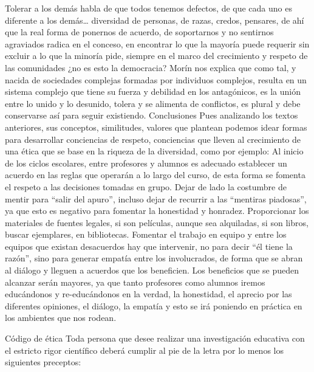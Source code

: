 Tolerar a los demás habla de que todos tenemos defectos, de que cada uno es diferente a los demás… diversidad de personas, de razas, credos, pensares, de ahí que la real forma de ponernos de acuerdo, de soportarnos y no sentirnos agraviados radica en el conceso, en encontrar lo que la mayoría puede requerir sin excluir a lo que la minoría pide, siempre en el marco del crecimiento y respeto de las comunidades ¿no es esto la democracia?
Morín nos explica que como tal, y nacida de sociedades complejas formadas por individuos complejos, resulta en un sistema complejo que tiene su fuerza y debilidad en los antagónicos, es la unión entre lo unido y lo desunido, tolera y se alimenta de conflictos, es plural y debe conservarse así para seguir existiendo.
Conclusiones
Pues analizando los textos anteriores, sus conceptos, similitudes, valores que plantean podemos idear formas para desarrollar conciencias de respeto, conciencias que lleven al crecimiento de una ética que se base en la riqueza de la diversidad, como por ejemplo:
Al inicio de los ciclos escolares, entre profesores y alumnos es adecuado establecer un acuerdo en las reglas que operarán a lo largo del curso, de esta forma se fomenta el respeto a las decisiones tomadas en grupo.
Dejar de lado la costumbre de mentir para “salir del apuro”, incluso dejar de recurrir a las “mentiras piadosas”, ya que esto es negativo para fomentar la honestidad y honradez.
Proporcionar los materiales de fuentes legales, si son películas, aunque sea alquiladas, si son libros, buscar ejemplares, en bibliotecas.
Fomentar el trabajo en equipo y entre los equipos que existan desacuerdos hay que intervenir, no para decir “él tiene la razón”, sino para generar empatía entre los involucrados, de forma que se abran al diálogo y lleguen a acuerdos que los beneficien.
Los beneficios que se pueden alcanzar serán mayores, ya que tanto profesores como alumnos iremos educándonos y re-educándonos en la verdad, la honestidad, el aprecio por las diferentes opiniones, el diálogo, la empatía y esto se irá poniendo en práctica en los ambientes que nos rodean.

Código de ética
Toda persona que desee realizar una investigación educativa con el estricto rigor científico deberá cumplir al pie de la letra por lo menos los siguientes preceptos:

